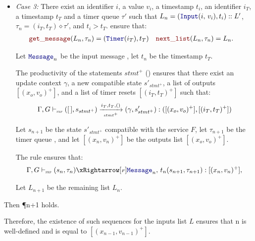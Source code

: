 \begin{skippableproof}
\begin{itemize}
\begin{itemize}
                        Let $L_{n+1}$ be the remaining list $L'$.

                  \item \textit{Case 3:} There exist an identifier $i$, a value $v_i$, a timestamp
                        $t_i$, an identifier $i_T$, a timestamp $t_T$ and a timer queue $\tau'$ such
                        that $L_n = (\inputMess{i}{v_i}, t_i) :: L'$, $\tau_n = (i_T, t_T) \diamond
                            \tau'$, and $t_i > t_T$.
                        ensure that:
                        \begin{align*}
                            \getMess{L_n}{\tau_n}  & = (\timerMess{i_T}, t_T) &
                            \nextList{L_n}{\tau_n} & = L_n.
                        \end{align*}

                        Let $\mess_n$ be the input message , let $t_n$ be the
                        timestamp $t_T$.

                        The productivity of the statements $stmt^+$ () ensures that there exist an update context
                        $\gamma$, a new compatible state $s'_{stmt^+}$, a list of outputs $[(x_o,
                                    v_o)^+]$, and a list of timer resets $[(i_T, t_T)^+]$ such that:
                        \begin{equation*}
                            \Gamma, G \vdash_{\textnormal{\tiny\textsc{frp}}} ([\,], s_{stmt^+}) \xrightarrow[\mbox{\tiny\ensuremath{stmt^+}}]{i_T, t_T, ()} (\gamma, s'_{stmt^+}): ([(x_o, v_o)^+], [(i_T, t_T)^+])
                        \end{equation*}

                        Let $s_{n+1}$ be the state $s'_{stmt^+}$ compatible with the service $F$,
                        let $\tau_{n+1}$ be the timer queue , and let
                        $[(x_n, v_n)^+]$ be the outputs list $[(x_o, v_o)^+]$.

                        The rule  ensures
                        that:
                        \begin{equation*}
                            \serviceOpSem{s_n}{\tau_n}{F}{\mess_n}{t_n}{s_{n+1}}{\tau_{n+1}}{(x_n, v_n)^+},
                        \end{equation*}

                        Let $L_{n+1}$ be the remaining list $L_n$.
              \end{itemize}
              Then \P{n+1} holds.
    \end{itemize}

    Therefore, the existence of such sequences for the inputs list $L$ ensures that 
    {n} is well-defined and is equal to $[(x_{n-1}, v_{n-1})^+]$.
\end{skippableproof}

